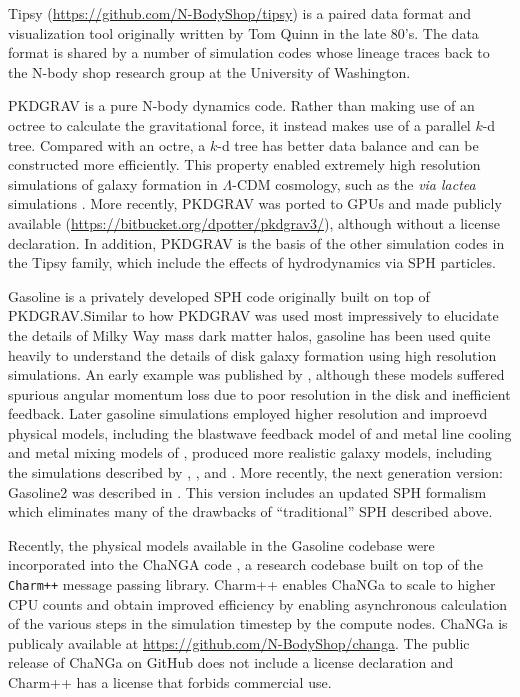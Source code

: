 \documentclass[11pt,twoside]{article}
\begin{document}
Tipsy (\url{https://github.com/N-BodyShop/tipsy}) is a paired data format and visualization tool originally written by Tom Quinn in the late 80's. The data format is shared by a number of simulation codes whose lineage traces back to the N-body shop research group at the University of Washington.

PKDGRAV \citep{stadel2001} is a pure N-body dynamics code. Rather than making use of an octree to calculate the gravitational force, it instead makes use of a parallel $k$-d tree. Compared with an octre, a $k$-d tree has better data balance and can be constructed more efficiently. This property enabled extremely high resolution simulations of galaxy formation in $\Lambda$-CDM cosmology, such as the {\it via lactea\/} simulations \citep{diemand2007, diemand2008}. More recently, PKDGRAV was ported to GPUs \citep{potter2017} and made publicly available (\url{https://bitbucket.org/dpotter/pkdgrav3/}), although without a license declaration. In addition, PKDGRAV is the basis of the other simulation codes in the Tipsy family, which include the effects of hydrodynamics via SPH particles.

Gasoline \citep{wadsley2004} is a privately developed SPH code originally built on top of PKDGRAV.\@ Similar to how PKDGRAV was used most impressively to elucidate the details of Milky Way mass dark matter halos, gasoline has been used quite heavily to understand the details of disk galaxy formation using high resolution simulations. An early example was published by \citet{governato2004}, although these models suffered spurious angular momentum loss due to poor resolution in the disk and inefficient feedback.  Later gasoline simulations employed higher resolution and improevd physical models, including the blastwave feedback model of \citet{stinson2006} and metal line cooling and metal mixing models of \citet{shen2010}, produced more realistic galaxy models, including the simulations described by \citet{guedes2011}, \citet{pontzen2012}, and \citet{zolotov2012}. More recently, the next generation version: Gasoline2 was described in \citet{wadsley2017}. This version includes an updated SPH formalism which eliminates many of the drawbacks of ``traditional'' SPH described above.

Recently, the physical models available in the Gasoline codebase were incorporated into the ChaNGA code \citep{jetley2008}, a research codebase built on top of the \texttt{Charm++} message passing library. Charm++ enables ChaNGa to scale to higher CPU counts and obtain improved efficiency by enabling asynchronous calculation of the various steps in the simulation timestep by the compute nodes. ChaNGa is publicaly available at \url{https://github.com/N-BodyShop/changa}. The public release of ChaNGa on GitHub does not include a license declaration and Charm++ has a license that forbids commercial use.
\end{document}
